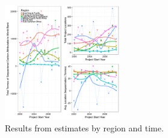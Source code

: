 \documentclass[sustainability,article,submit,moreauthors,pdftex,10pt,a4paper]{mdpi}
\begin{document}
\begin{figure}[H]
\centering
 \includegraphics[width=0.45\textwidth]{result_disag.png}
\caption{Results from estimates by region and time.}
\label{result_fig}
\vspace{10pt}
\end{figure}  
\end{document}
